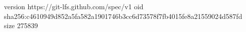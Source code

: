 version https://git-lfs.github.com/spec/v1
oid sha256:c4610949d852a5fa582a1901746b3cc6d73578f7fb4015fe8a21559024d587fd
size 275839
